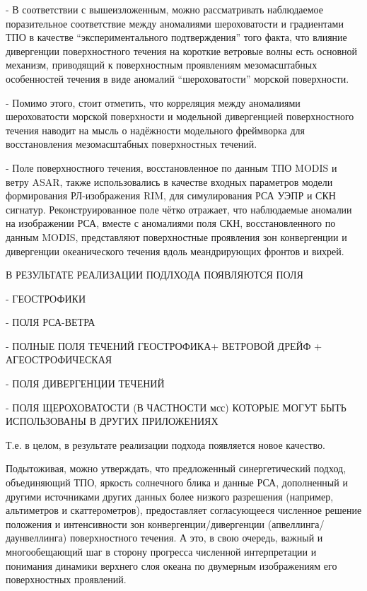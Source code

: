 - В соответствии с вышеизложенным, можно рассматривать наблюдаемое поразительное соответствие между аномалиями шероховатости и градиентами ТПО в качестве ``экспериментального подтверждения'' того факта, что влияние дивергенции поверхностного течения на короткие ветровые волны есть основной механизм, приводящий к поверхностным проявлениям мезомасштабных особенностей течения в виде аномалий ``шероховатости'' морской поверхности. 

- Помимо этого, стоит отметить, что корреляция между аномалиями шероховатости морской поверхности и модельной дивергенцией поверхностного течения наводит на мысль о надёжности модельного фреймворка для восстановления мезомасштабных поверхностных течений.

- Поле поверхностного течения, восстановленное по данным ТПО MODIS и ветру ASAR, также использовались в качестве входных параметров модели формирования РЛ-изображения RIM, для симулирования РСА УЭПР и СКН сигнатур. Реконструированное поле чётко отражает, что наблюдаемые аномалии на изображении РСА, вместе с аномалиями поля СКН, восстановленного по данным MODIS, представляют поверхностные проявления зон конвергенции и дивергенции океанического течения вдоль меандрирующих фронтов и вихрей.



В РЕЗУЛЬТАТЕ РЕАЛИЗАЦИИ ПОДЛХОДА ПОЯВЛЯЮТСЯ ПОЛЯ



- ГЕОСТРОФИКИ

- ПОЛЯ РСА-ВЕТРА

- ПОЛНЫЕ ПОЛЯ ТЕЧЕНИЙ ГЕОСТРОФИКА+ ВЕТРОВОЙ ДРЕЙФ + АГЕОСТРОФИЧЕСКАЯ 

- ПОЛЯ ДИВЕРГЕНЦИИ ТЕЧЕНИЙ

- ПОЛЯ ЩЕРОХОВАТОСТИ (В ЧАСТНОСТИ мсс) КОТОРЫЕ МОГУТ БЫТЬ ИСПОЛЬЗОВАНЫ В ДРУГИХ ПРИЛОЖЕНИЯХ

Т.е. в целом, в результате реализации подхода появляется новое качество. 

Подытоживая, можно утверждать, что предложенный синергетический подход, объединяющий ТПО, яркость солнечного блика и данные РСА, дополненный и другими источниками других данных более низкого разрешения (например, альтиметров и скаттерометров), предоставляет согласующееся численное решение положения и интенсивности зон конвергенции/дивергенции (апвеллинга/даунвеллинга) поверхностного течения. А это, в свою очередь, важный и многообещающий шаг в сторону прогресса численной интерпретации и понимания динамики верхнего слоя океана по двумерным изображениям его поверхностных проявлений.



\clearpage